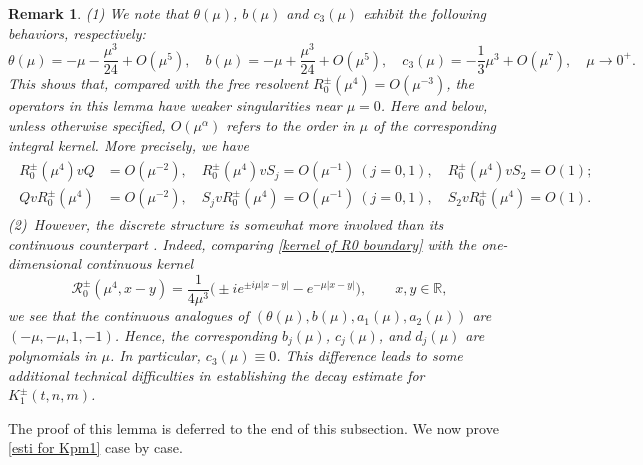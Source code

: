 \documentclass[reqno, 11pt]{amsart}
\newtheorem{remark}[definition]{Remark}
\newcommand\R{\mathbb{R}}
\newcommand\mcaR{\mathcal{R}}
\numberwithin{equation}{section}
\begin{document}
\begin{remark}\label{remark of cancelation lemma}
{\rm(1) We note that $\theta(\mu)$, $b(\mu)$ and $c_3(\mu)$ exhibit the following behaviors, respectively:
   \begin{equation}
    \theta(\mu)=-\mu-\frac{\mu^3}{24}+O(\mu^5),\quad b(\mu)=-\mu+\frac{\mu^3}{24}+O(\mu^5),\quad c_3(\mu)=-\frac{1}{3}\mu^3+O(\mu^7),\quad \mu\rightarrow0^+.  
   \end{equation}
This shows that, compared with the free resolvent $R_0^\pm(\mu^4)=O(\mu^{-3})$, the operators in this lemma have weaker singularities near $\mu=0$. Here and below, unless otherwise specified, $O(\mu^\alpha)$ refers to the order in $\mu$ of the corresponding integral kernel. More precisely, we have
\begin{align}\label{order of operators in cancel lemma 0}
\begin{split}
R^{\pm}_0(\mu^4)vQ&=O(\mu^{-2}),\quad R^{\pm}_0(\mu^4)vS_j=O(\mu^{-1})~(j=0,1),\quad  R^{\pm}_0(\mu^4)vS_2=O(1);\\
QvR^{\pm}_0(\mu^4)&=O(\mu^{-2}),\quad S_jvR^{\pm}_0(\mu^4)=O(\mu^{-1})~(j=0,1),\quad  S_2vR^{\pm}_0(\mu^4)=O(1).
\end{split}
\end{align}
\vskip0.1cm
\noindent(2)~However, the discrete structure is somewhat more involved than its continuous counterpart \cite{SWY22}. Indeed, comparing \eqref{kernel of R0 boundary} with the one-dimensional continuous kernel
$$
\mcaR^{\pm}_0(\mu^4,x-y)
=\frac{1}{4\mu^3}\big(\pm i e^{\pm i\mu|x-y|}-e^{-\mu|x-y|}\big),
\qquad x,y\in\R,
$$
we see that the continuous analogues of $(\theta(\mu),b(\mu),a_1(\mu),a_2(\mu))$ are $(-\mu,-\mu,1,-1)$. Hence, the corresponding ${b}_j(\mu)$, ${c}_j(\mu)$, and ${d}_j(\mu)$ are polynomials in $\mu$. In particular, $c_3(\mu)\equiv0$. This difference leads to some additional technical difficulties in establishing the decay estimate for $K_1^\pm(t,n,m)$.
}
\end{remark}
The proof of this lemma is deferred to the end of this subsection. We now prove \eqref{esti for Kpm1} case by case.
\end{document}

